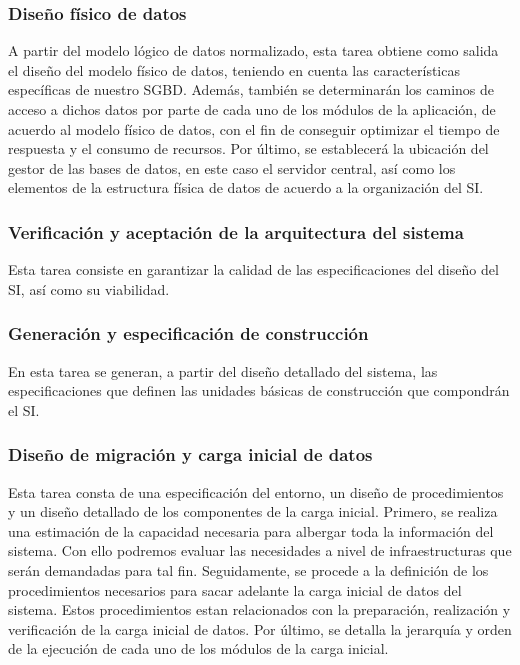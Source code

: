 \documentclass[11pt,a4paper,spanish,twoside]{book}
\begin{document}
\subsubsection{Diseño físico de datos}
A partir del modelo lógico de datos normalizado, esta tarea
obtiene como salida el diseño del modelo físico de datos, teniendo en cuenta 
las características específicas de nuestro SGBD. Además, también se 
determinarán los caminos de acceso a dichos datos por parte de cada uno de los 
módulos de la aplicación, de acuerdo al modelo físico de datos, con el fin de 
conseguir optimizar el tiempo de respuesta y el consumo de recursos. Por 
último, se establecerá la ubicación del gestor de las bases de datos, en este
caso el servidor central, así como los elementos de la estructura física de 
datos de acuerdo a la organización del SI.

\subsubsection{Verificación y aceptación de la arquitectura del sistema}
Esta tarea consiste en garantizar la calidad de las especificaciones del diseño
del SI, así como su viabilidad.

\subsubsection{Generación y especificación de construcción}
En esta tarea se generan, a partir del diseño detallado del sistema, las 
especificaciones que definen las unidades básicas de construcción que 
compondrán el SI.

\subsubsection{Diseño de migración y carga inicial de datos}
Esta tarea consta de una especificación del entorno, un diseño de 
procedimientos y un diseño detallado de los componentes de la carga inicial. 
Primero, se realiza una estimación de la capacidad necesaria para albergar 
toda la información del sistema. Con ello podremos evaluar las necesidades a 
nivel de infraestructuras que serán demandadas para tal fin. Seguidamente, se 
procede a la definición de los procedimientos necesarios para sacar adelante 
la carga inicial de datos del sistema. Estos procedimientos estan relacionados 
con la preparación, realización y verificación de la carga inicial de datos. 
Por último, se detalla la jerarquía y orden de la ejecución de cada uno de los 
módulos de la carga inicial.
\end{document}
